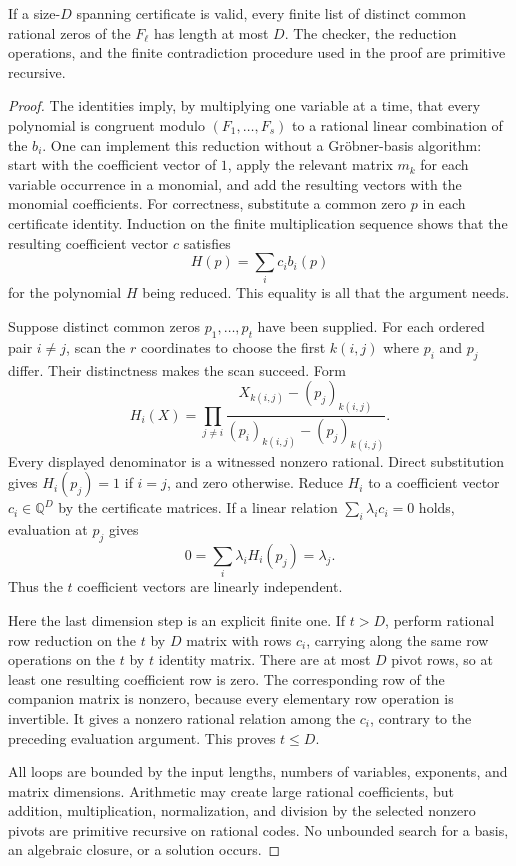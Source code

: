 \begin{theorem}
\label{thm:finite-algebra-zeros}
If a size-$D$ spanning certificate is valid, every finite list of distinct
common rational zeros of the $F_\ell$ has length at most $D$.
The checker, the reduction operations, and the finite contradiction
procedure used in the proof are primitive recursive.
\end{theorem}

\begin{proof}
The identities imply, by multiplying one variable at a time, that every
polynomial is congruent modulo $(F_1,\ldots,F_s)$ to a rational linear
combination of the $b_i$.  One can implement this reduction without a
Gr\"obner-basis algorithm: start with the coefficient vector of $1$,
apply the relevant matrix $m_k$ for each variable occurrence in a
monomial, and add the resulting vectors with the monomial coefficients.
For correctness, substitute a common zero $p$ in each certificate
identity.  Induction on the finite multiplication sequence shows that
the resulting coefficient vector $c$ satisfies
\[
                   H(p)=\sum_i c_i b_i(p)
\]
for the polynomial $H$ being reduced.  This equality is all that the
argument needs.

Suppose distinct common zeros $p_1,\ldots,p_t$ have been supplied.
For each ordered pair $i\ne j$, scan the $r$ coordinates to choose
the first $k(i,j)$ where $p_i$ and $p_j$ differ.  Their distinctness
makes the scan succeed.  Form
\[
 H_i(X)=\prod_{j\ne i}
 \frac{X_{k(i,j)}-(p_j)_{k(i,j)}}
      {(p_i)_{k(i,j)}-(p_j)_{k(i,j)}}.
\]
Every displayed denominator is a witnessed nonzero rational.  Direct
substitution gives $H_i(p_j)=1$ if $i=j$, and zero otherwise.
Reduce $H_i$ to a coefficient vector $c_i\in\mathbb Q^D$ by the
certificate matrices.  If a linear relation
$\sum_i\lambda_i c_i=0$ holds, evaluation at $p_j$ gives
\[
       0=\sum_i\lambda_i H_i(p_j)=\lambda_j.
\]
Thus the $t$ coefficient vectors are linearly independent.

Here the last dimension step is an explicit finite one.  If $t>D$,
perform rational row reduction on the $t$ by $D$ matrix with rows $c_i$,
carrying along the same row operations on the $t$ by $t$ identity matrix.
There are at most $D$ pivot rows, so at least one resulting coefficient
row is zero.  The corresponding row of the companion matrix is nonzero,
because every elementary row operation is invertible.  It gives a
nonzero rational relation among the $c_i$, contrary to the preceding
evaluation argument.  This proves $t\le D$.

All loops are bounded by the input lengths, numbers of variables,
exponents, and matrix dimensions.  Arithmetic may create large rational
coefficients, but addition, multiplication, normalization, and division
by the selected nonzero pivots are primitive recursive on rational codes.
No unbounded search for a basis, an algebraic closure, or a solution occurs.
\end{proof}

